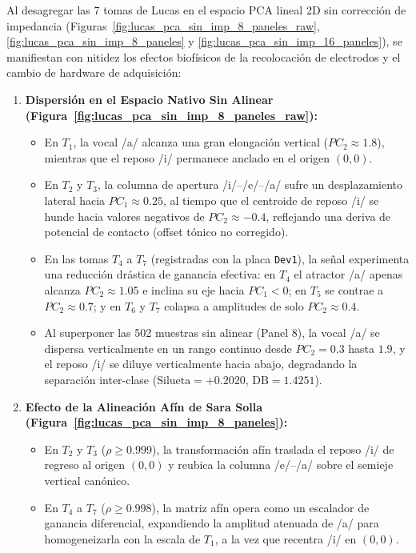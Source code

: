 \documentclass[11pt,a4paper]{article}
\begin{document}
Al desagregar las 7 tomas de Lucas en el espacio PCA lineal 2D sin corrección de impedancia (Figuras~\ref{fig:lucas_pca_sin_imp_8_paneles_raw}, \ref{fig:lucas_pca_sin_imp_8_paneles} y \ref{fig:lucas_pca_sin_imp_16_paneles}), se manifiestan con nitidez los efectos biofísicos de la recolocación de electrodos y el cambio de hardware de adquisición:
\begin{enumerate}
    \item \textbf{Dispersión en el Espacio Nativo Sin Alinear (Figura~\ref{fig:lucas_pca_sin_imp_8_paneles_raw}):}
    \begin{itemize}
        \item En $T_1$, la vocal /a/ alcanza una gran elongación vertical ($PC_2 \approx 1.8$), mientras que el reposo /i/ permanece anclado en el origen $(0,0)$.
        \item En $T_2$ y $T_3$, la columna de apertura /i/--/e/--/a/ sufre un desplazamiento lateral hacia $PC_1 \approx 0.25$, al tiempo que el centroide de reposo /i/ se hunde hacia valores negativos de $PC_2 \approx -0.4$, reflejando una deriva de potencial de contacto (offset tónico no corregido).
        \item En las tomas $T_4$ a $T_7$ (registradas con la placa \texttt{Dev1}), la señal experimenta una reducción drástica de ganancia efectiva: en $T_4$ el atractor /a/ apenas alcanza $PC_2 \approx 1.05$ e inclina su eje hacia $PC_1 < 0$; en $T_5$ se contrae a $PC_2 \approx 0.7$; y en $T_6$ y $T_7$ colapsa a amplitudes de solo $PC_2 \approx 0.4$.
        \item Al superponer las 502 muestras sin alinear (Panel 8), la vocal /a/ se dispersa verticalmente en un rango continuo desde $PC_2 = 0.3$ hasta $1.9$, y el reposo /i/ se diluye verticalmente hacia abajo, degradando la separación inter-clase ($\text{Silueta} = +0.2020$, $\text{DB} = 1.4251$).
    \end{itemize}
    \item \textbf{Efecto de la Alineación Afín de Sara Solla (Figura~\ref{fig:lucas_pca_sin_imp_8_paneles}):}
    \begin{itemize}
        \item En $T_2$ y $T_3$ ($\rho \ge 0.999$), la transformación afín traslada el reposo /i/ de regreso al origen $(0,0)$ y reubica la columna /e/--/a/ sobre el semieje vertical canónico.
        \item En $T_4$ a $T_7$ ($\rho \ge 0.998$), la matriz afín opera como un escalador de ganancia diferencial, expandiendo la amplitud atenuada de /a/ para homogeneizarla con la escala de $T_1$, a la vez que recentra /i/ en $(0,0)$.

\end{itemize}
\end{enumerate}
\end{document}

